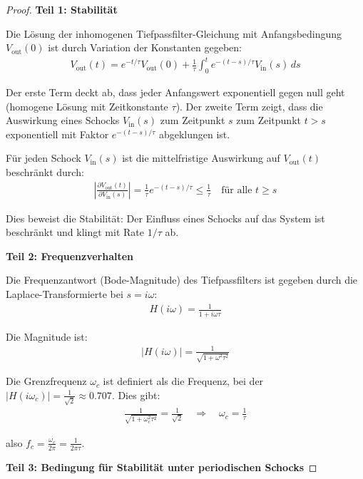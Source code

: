 \documentclass[a4paper, 12pt, twoside, openright]{report}
\theoremstyle{definition}
\theoremstyle{definition}
\begin{document}
\begin{proof}

\textbf{Teil 1: Stabilität}

Die Lösung der inhomogenen Tiefpassfilter-Gleichung mit Anfangsbedingung $V_{\text{out}}(0)$ ist durch Variation der Konstanten gegeben:
\begin{align}
V_{\text{out}}(t) = e^{-t/\tau} V_{\text{out}}(0) + \frac{1}{\tau} \int_0^t e^{-(t-s)/\tau} V_{\text{in}}(s) \, ds
\end{align}

Der erste Term deckt ab, dass jeder Anfangswert exponentiell gegen null geht (homogene Lösung mit Zeitkonstante $\tau$). Der zweite Term zeigt, dass die Auswirkung eines Schocks $V_{\text{in}}(s)$ zum Zeitpunkt $s$ zum Zeitpunkt $t > s$ exponentiell mit Faktor $e^{-(t-s)/\tau}$ abgeklungen ist.

Für jeden Schock $V_{\text{in}}(s)$ ist die mittelfristige Auswirkung auf $V_{\text{out}}(t)$ beschränkt durch:
\begin{align}
\left| \frac{\partial V_{\text{out}}(t)}{\partial V_{\text{in}}(s)} \right| = \frac{1}{\tau} e^{-(t-s)/\tau} \leq \frac{1}{\tau} \quad \text{für alle } t \geq s
\end{align}

Dies beweist die Stabilität: Der Einfluss eines Schocks auf das System ist beschränkt und klingt mit Rate $1/\tau$ ab.

\textbf{Teil 2: Frequenzverhalten}

Die Frequenzantwort (Bode-Magnitude) des Tiefpassfilters ist gegeben durch die Laplace-Transformierte bei $s = i\omega$:
\begin{align}
H(i\omega) = \frac{1}{1 + i\omega\tau}
\end{align}

Die Magnitude ist:
\begin{align}
|H(i\omega)| = \frac{1}{\sqrt{1 + \omega^2\tau^2}}
\end{align}

Die Grenzfrequenz $\omega_c$ ist definiert als die Frequenz, bei der $|H(i\omega_c)| = \frac{1}{\sqrt{2}} \approx 0.707$. Dies gibt:
\begin{align}
\frac{1}{\sqrt{1 + \omega_c^2\tau^2}} = \frac{1}{\sqrt{2}} \quad \Rightarrow \quad \omega_c = \frac{1}{\tau}
\end{align}

also $f_c = \frac{\omega_c}{2\pi} = \frac{1}{2\pi\tau}$.

\textbf{Teil 3: Bedingung für Stabilität unter periodischen Schocks}


\end{proof}
\end{document}
